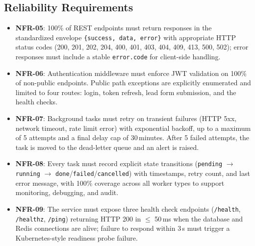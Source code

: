 \documentclass[a4paper]{article}
\begin{document}
\subsection{Reliability Requirements}
\begin{itemize}
    \item \textbf{NFR-05}: 100\% of REST endpoints must return
    responses in the standardized envelope
    \texttt{\{success, data, error\}} with appropriate HTTP status
    codes (200, 201, 202, 204, 400, 401, 403, 404, 409, 413, 500,
    502); error responses must include a stable
    \texttt{error.code} for client-side handling.
    \item \textbf{NFR-06}: Authentication middleware must enforce
    JWT validation on 100\% of non-public endpoints. Public path
    exceptions are explicitly enumerated and limited to four
    routes: login, token refresh, lead form submission, and the
    health checks.
    \item \textbf{NFR-07}: Background tasks must retry on
    transient failures (HTTP 5xx, network timeout, rate limit
    error) with exponential backoff, up to a maximum of 5 attempts
    and a final delay cap of 30\,minutes. After 5 failed attempts,
    the task is moved to the dead-letter queue and an alert is
    raised.
    \item \textbf{NFR-08}: Every task must record explicit state
    transitions
    (\texttt{pending} $\to$ \texttt{running} $\to$
    \texttt{done}/\texttt{failed}/\texttt{cancelled}) with
    timestamps, retry count, and last error message, with 100\%
    coverage across all worker types to support monitoring,
    debugging, and audit.
    \item \textbf{NFR-09}: The service must expose three health
    check endpoints
    (\texttt{/health}, \texttt{/healthz}, \texttt{/ping})
    returning HTTP 200 in $\leq$ 50\,ms when the database and
    Redis connections are alive; failure to respond within 3\,s
    must trigger a Kubernetes-style readiness probe failure.
\end{itemize}
\end{document}
